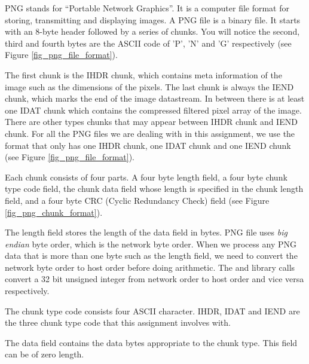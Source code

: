 PNG stands for ``Portable Network Graphics''. It is a computer file format for storing, transmitting and displaying images\cite{Roelofs1999PNG}. A PNG file is a binary file. It starts with an 8-byte header followed by a series of chunks. You will notice the second, third and fourth bytes are the ASCII code of 'P', 'N' and 'G' respectively (see Figure \ref{fig_png_file_format}).

The first chunk is the IHDR chunk, which contains meta information of the image such as the dimensions of the pixels. The last chunk is always the IEND chunk, which marks the end of the image datastream. In between there is at least one IDAT chunk which contains the compressed filtered pixel array of the image. There are other types chunks that may appear between IHDR chunk and IEND chunk. For all the PNG files we are dealing with in this assignment, we use the format that only has one IHDR chunk, one IDAT chunk and one IEND chunk (see Figure \ref{fig_png_file_format}).


Each chunk consists of four parts. A four byte length field, a four byte chunk type code field, the chunk data field whose length is specified in the chunk length field, and a four byte CRC (Cyclic Redundancy Check) field (see Figure \ref{fig_png_chunk_format}).

The length field stores the length of the data field in bytes. PNG file uses {\em big endian} byte order, which is the network byte order. When we process any PNG data that is more than one byte such as the length field, we need to convert the network byte order to host order before doing arithmetic. The  and  library calls convert a 32 bit unsigned integer from network order to host order and vice versa respectively.



The chunk type code consists four ASCII character. IHDR, IDAT and IEND are the three chunk type code that this assignment involves with.

The data field contains the data bytes appropriate to the chunk type. This field can be of zero length.

